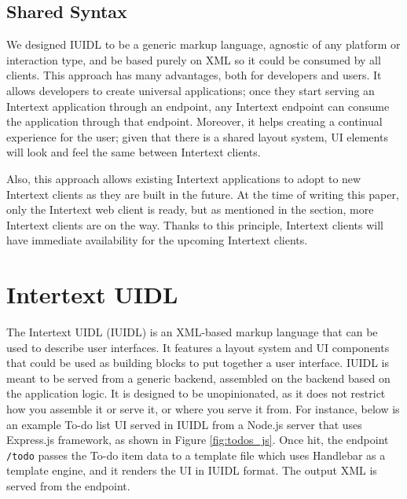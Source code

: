\subsection{Shared Syntax}

We designed IUIDL to be a generic markup language, agnostic of any platform or interaction type, and be based purely on XML so it could be consumed by all clients. This approach has many advantages, both for developers and users. It allows developers to create universal applications; once they start serving an Intertext application through an endpoint, any Intertext endpoint can consume the application through that endpoint. Moreover, it helps creating a continual experience for the user; given that there is a shared layout system, UI elements will look and feel the same between Intertext clients.

Also, this approach allows existing Intertext applications to adopt to new Intertext clients as they are built in the future. At the time of writing this paper, only the Intertext web client is ready, but as mentioned in the  section, more Intertext clients are on the way. Thanks to this principle, Intertext clients will have immediate availability for the upcoming Intertext clients.

\section{Intertext UIDL} \label{intertextUIDL}

The Intertext UIDL (IUIDL) is an XML-based markup language that can be used to describe user interfaces. It features a layout system and UI components that could be used as building blocks to put together a user interface. IUIDL is meant to be served from a generic backend, assembled on the backend based on the application logic. It is designed to be unopinionated, as it does not restrict how you assemble it or serve it, or where you serve it from. For instance, below is an example To-do list UI served in IUIDL from a Node.js server that uses Express.js framework, as shown in Figure \ref{fig:todos_js}. Once hit, the endpoint \texttt{/todo} passes the To-do item data to a template file which uses Handlebar as a template engine, and it renders the UI in IUIDL format. The output XML is served from the endpoint.

